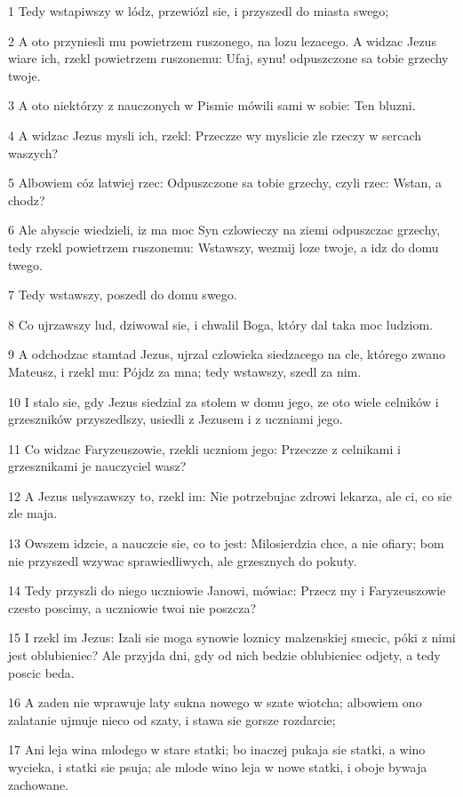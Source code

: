 \par 1 Tedy wstapiwszy w lódz, przewiózl sie, i przyszedl do miasta swego;
\par 2 A oto przyniesli mu powietrzem ruszonego, na lozu lezacego. A widzac Jezus wiare ich, rzekl powietrzem ruszonemu: Ufaj, synu! odpuszczone sa tobie grzechy twoje.
\par 3 A oto niektórzy z nauczonych w Pismie mówili sami w sobie: Ten bluzni.
\par 4 A widzac Jezus mysli ich, rzekl: Przeczze wy myslicie zle rzeczy w sercach waszych?
\par 5 Albowiem cóz latwiej rzec: Odpuszczone sa tobie grzechy, czyli rzec: Wstan, a chodz?
\par 6 Ale abyscie wiedzieli, iz ma moc Syn czlowieczy na ziemi odpuszczac grzechy, tedy rzekl powietrzem ruszonemu: Wstawszy, wezmij loze twoje, a idz do domu twego.
\par 7 Tedy wstawszy, poszedl do domu swego.
\par 8 Co ujrzawszy lud, dziwowal sie, i chwalil Boga, który dal taka moc ludziom.
\par 9 A odchodzac stamtad Jezus, ujrzal czlowieka siedzacego na cle, którego zwano Mateusz, i rzekl mu: Pójdz za mna; tedy wstawszy, szedl za nim.
\par 10 I stalo sie, gdy Jezus siedzial za stolem w domu jego, ze oto wiele celników i grzeszników przyszedlszy, usiedli z Jezusem i z uczniami jego.
\par 11 Co widzac Faryzeuszowie, rzekli uczniom jego: Przeczze z celnikami i grzesznikami je nauczyciel wasz?
\par 12 A Jezus uslyszawszy to, rzekl im: Nie potrzebujac zdrowi lekarza, ale ci, co sie zle maja.
\par 13 Owszem idzcie, a nauczcie sie, co to jest: Milosierdzia chce, a nie ofiary; bom nie przyszedl wzywac sprawiedliwych, ale grzesznych do pokuty.
\par 14 Tedy przyszli do niego uczniowie Janowi, mówiac: Przecz my i Faryzeuszowie czesto poscimy, a uczniowie twoi nie poszcza?
\par 15 I rzekl im Jezus: Izali sie moga synowie loznicy malzenskiej smecic, póki z nimi jest oblubieniec? Ale przyjda dni, gdy od nich bedzie oblubieniec odjety, a tedy poscic beda.
\par 16 A zaden nie wprawuje laty sukna nowego w szate wiotcha; albowiem ono zalatanie ujmuje nieco od szaty, i stawa sie gorsze rozdarcie;
\par 17 Ani leja wina mlodego w stare statki; bo inaczej pukaja sie statki, a wino wycieka, i statki sie psuja; ale mlode wino leja w nowe statki, i oboje bywaja zachowane.
